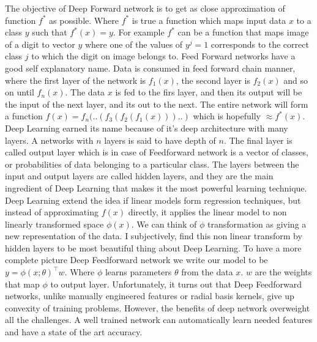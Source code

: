 \documentclass[paper=a4, fontsize=11pt]{scrartcl}
\numberwithin{equation}{section}		%
\numberwithin{figure}{section}			%
\numberwithin{table}{section}			%
\begin{document}
	\par 
		The objective of Deep Forward network is to get as close approximation of function $f^*$ as possible. Where $f^*$ is true a function which maps input data $x$ to a class $y$ such that $ f^*(x) = y $. For example $f^*$ can be a function that maps image of a digit to vector $y$ where one of the values of $y^j = 1$ corresponds to the correct class $j$ to which the digit on image belongs to.
	Feed Forward networks have a good self explanatory name. Data is consumed in feed forward chain manner, where the first layer of the network is $f_1(x)$, the second layer is $f_2(x)$ and so on until $f_n(x)$. The data $x$ is fed to the firs layer, and then its output will be the input of the next layer, and its out to the next. The entire network will form a function $f(x) = f_n(..(f_3(f_2(f_1(x)))..) $ which is hopefully $\approx f^*(x)$. Deep Learning earned its name because of it's deep architecture with many layers. A networks with $n$ layers is said to have depth of $n$. The final layer is called output layer which is in case of Feedforward network is a vector of classes, or probabilities of data belonging to a particular class. The layers between the input and output layers are called hidden layers, and they are the main ingredient of Deep Learning that makes it the most powerful learning technique. Deep Learning extend the idea if linear models form regression techniques, but instead of approximating $f(x)$ directly, it applies the linear model to non linearly transformed space $\phi(x)$. We can think of $\phi$ transformation as giving a new representation of the data. I subjectively, find this non linear transform by hidden layers to be most beautiful thing about Deep Learning. To have a more complete picture Deep Feedforward network we write our model to be $y = \phi(x;\theta)^\top w $. Where $\phi$ learns parameters $\theta$ from the data $x$. $w$ are the weights that map $\phi$ to output layer.
	Unfortunately, it turns out that Deep Feedforward networks, unlike manually engineered features or radial basis kernels, give up convexity of training problems. However, the benefits of deep network overweight all the challenges. A well trained network can automatically learn needed features and have a state of the art accuracy.
	
	
\end{document}
